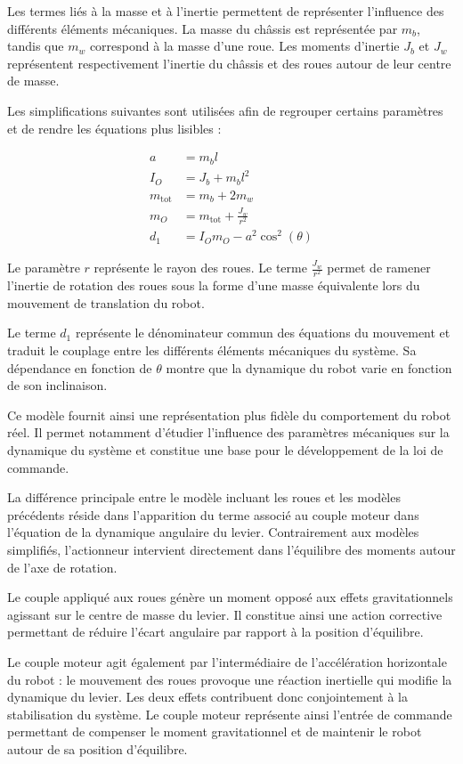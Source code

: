Les termes liés à la masse et à l'inertie permettent de représenter l'influence des différents éléments mécaniques. La masse du châssis est représentée par $m_b$, tandis que $m_w$ correspond à la masse d'une roue. Les moments d'inertie $J_b$ et $J_w$ représentent respectivement l'inertie du châssis et des roues autour de leur centre de masse.

Les simplifications suivantes sont utilisées afin de regrouper certains paramètres et de rendre les équations plus lisibles :

\begin{equation}
\begin{aligned}
a &= m_b l \\
I_O &= J_b + m_b l^2 \\
m_{\mathrm{tot}} &= m_b + 2m_w \\
m_O &= m_{\mathrm{tot}} + \frac{J_w}{r^2} \\
d_1 &= I_O m_O - a^2\cos^2(\theta)
\end{aligned}
\end{equation}

Le paramètre $r$ représente le rayon des roues. Le terme $\frac{J_w}{r^2}$ permet de ramener l'inertie de rotation des roues sous la forme d'une masse équivalente lors du mouvement de translation du robot.

Le terme $d_1$ représente le dénominateur commun des équations du mouvement et traduit le couplage entre les différents éléments mécaniques du système. Sa dépendance en fonction de $\theta$ montre que la dynamique du robot varie en fonction de son inclinaison.

Ce modèle fournit ainsi une représentation plus fidèle du comportement du robot réel. Il permet notamment d'étudier l'influence des paramètres mécaniques sur la dynamique du système et constitue une base pour le développement de la loi de commande.

La différence principale entre le modèle incluant les roues et les modèles précédents réside dans l'apparition du terme associé au couple moteur dans l'équation de la dynamique angulaire du levier. Contrairement aux modèles simplifiés, l'actionneur intervient directement dans l'équilibre des moments autour de l'axe de rotation.

Le couple appliqué aux roues génère un moment opposé aux effets gravitationnels agissant sur le centre de masse du levier. Il constitue ainsi une action corrective permettant de réduire l'écart angulaire par rapport à la position d'équilibre. 

Le couple moteur agit également par l'intermédiaire de l'accélération horizontale du robot : le mouvement des roues provoque une réaction inertielle qui modifie la dynamique du levier. Les deux effets contribuent donc conjointement à la stabilisation du système. Le couple moteur représente ainsi l'entrée de commande permettant de compenser le moment gravitationnel et de maintenir le robot autour de sa position d'équilibre.